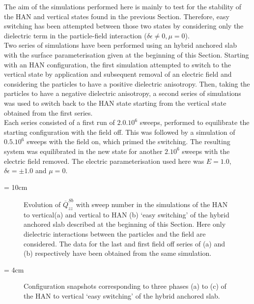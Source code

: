 The aim of the simulations performed here is mainly to test for the stability of the HAN and
vertical states found in the previous Section. Therefore, easy switching has been attempted
between those two states by considering only the dielectric term in the particle-field interaction
(\ie $\delta\epsilon \neq 0, \mu = 0$).\\
Two series of simulations have been performed using an hybrid anchored slab with the surface
parameterisation given at the beginning of this Section. Starting with an HAN configuration, the
first simulation attempted to switch to the vertical state by application and subsequent removal
of an electric field
and considering the particles to have a positive dielectric anisotropy. Then, taking the particles to
have a negative dielectric anisotropy, a second series of simulations was used to switch back to
the HAN state starting from the vertical state obtained from the first series.\\
Each series consisted of a first run of $2.0.10^6$ sweeps, performed to equilibrate the
starting configuration with the field off. This was followed by a simulation of
$0.5.10^6$ sweeps with the field on, which primed the switching. The resulting system
was equilibrated in the new state for another $2.10^6$ sweeps with the electric field removed.
The electric parameterisation used here was $E=1.0$, $\delta\epsilon = \pm 1.0$ and $\mu = 0$.



\picW = 10cm
\begin{figure}
	\centering
	\caption[Evolution of $\overline{Q}^{Sb}_{zz}$ with sweep number in the
	simulations of the HAN to vertical(a) and vertical to HAN (b) `easy switching'
	of the hybrid anchored slab described at the beginning of this Section.]
	{Evolution of $\overline{Q}^{Sb}_{zz}$ with sweep number in the
	simulations of the HAN to vertical(a) and vertical to HAN (b) `easy switching'
	of the hybrid anchored slab described at the beginning of this Section. 
	Here only dielectric interactions between the particles and the field are 
	considered. The data for the last and first field off series of (a) and (b) respectively
	have been
	obtained from the same simulation.}
	\label{fig:easySwitch_QzzWa}
\end{figure}


\picW = 4cm
\begin{figure}
	\centering
	\caption{Configuration snapshots corresponding to three phases (a) to (c) 
	of the HAN to vertical `easy switching' of the hybrid anchored slab.}
	\label{fig:easySwitch_HANtoVsnaps}
\end{figure}

